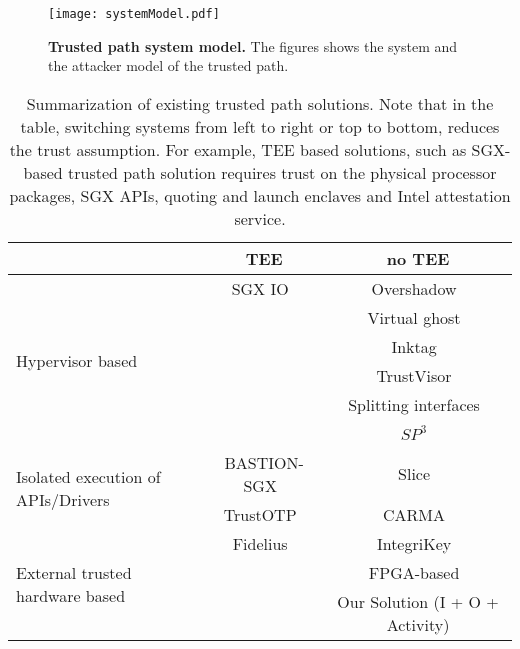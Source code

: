 \begin{figure}[t]
\centering
\texttt{[image: systemModel.pdf]}
\caption{\textbf{Trusted path system model.} The figures shows the system and the attacker model of the trusted path.}
\label{fig:systemModel}
\centering
\end{figure}

\iffalse
\myparagraph{Advantages}

\begin{enumerate}
  \item The \device does not need to know the formatting/template of the page. As the \device only looks to the current mouse position, the structure of the page is somewhat irrelevant (?).
\end{enumerate}
\fi


\begin{table*}[t]
\centering
  \begin{tabular}{ | l | c | c |}
    \hline
     & TEE & no TEE \\ \hline
    \multirow{6}{*}{Hypervisor based} & SGX IO~\cite{weiser2017sgxio} & Overshadow~\cite{Overshadow} \\ 
    & & Virtual ghost~\cite{criswell2014virtual}\\ 
    & & Inktag~\cite{hofmann2013inktag}\\ 
    & & TrustVisor~\cite{mccune2010trustvisor} \\ 
    & & Splitting interfaces~\cite{ta2006splitting}\\ 
    & & $SP^3$~\cite{yang2008using}\\ \hline
   \multirow{2}{*}{Isolated execution of APIs/Drivers} & BASTION-SGX~\cite{BASTION-SGX} & Slice~\cite{azab2011sice}\\ 
    & TrustOTP~\cite{sun2015trustotp} & CARMA~\cite{vasudevan2012carma} \\ \hline
    \multirow{3}{*}{External trusted hardware based} & Fidelius~\cite{Fidelius} & IntegriKey~\cite{IntegriKey} \\
    &  & FPGA-based~\cite{brandon2017trusted} \\
    &  & \textcolor{OliveGreen}{Our Solution (I + O + Activity)} \\
    \hline
  \end{tabular}
  \caption{Summarization of existing trusted path solutions. Note that in the table, switching systems from left to right or top to bottom, reduces the trust assumption. For example, TEE based solutions, such as SGX-based trusted path solution requires trust on the physical processor packages, SGX APIs, quoting and launch enclaves and Intel attestation service.}
\end{table*}


